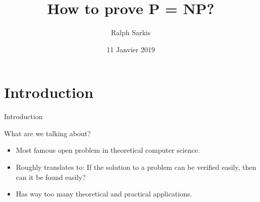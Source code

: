 \documentclass{beamer} %
\title[P vs. NP]{How to prove \textbf{P} = \textbf{NP}?}
\author{Ralph Sarkis}
\institute{SUMM - 2019}
\date{11 Janvier 2019}
\theoremstyle{definition}
\theoremstyle{remark}
\begin{document}
	
	\begin{frame}
	\titlepage
\end{frame}


\section{Introduction}

\begin{frame}{Introduction}
\begin{block}{What are we talking about?}
	\pause
	\begin{itemize}
		\item Most famous open problem in theoretical computer science.
		\item Roughly translates to: If the solution to a problem can be verified easily, then can it be found easily?
		\item Has way too many theoretical and practical applications.
	\end{itemize}
\end{block}
\end{frame}
\end{document}
